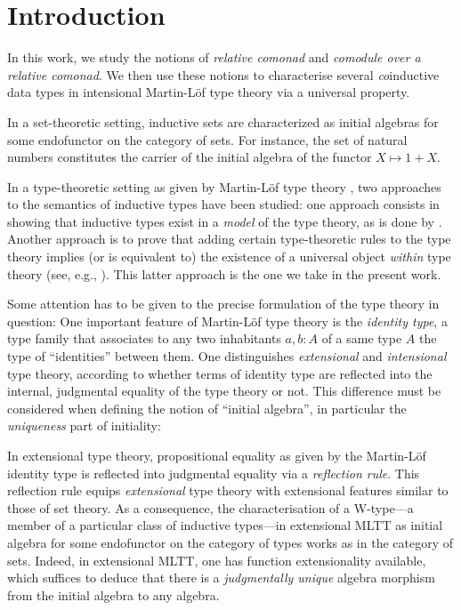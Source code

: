 \documentclass[envcountsame]{llncs}
\begin{document}
\section{Introduction}
 
 In this work, we study the notions of \emph{relative comonad} and \emph{comodule over a relative comonad}.
 We then use these notions to characterise several \emph{co}inductive data types in intensional Martin-L\"of type theory
 via a universal property.
 
 In a set-theoretic setting, inductive sets are characterized as initial algebras for 
 some endofunctor on the category of sets. For instance, the set of natural numbers constitutes the carrier of the 
 initial algebra of the functor $X \mapsto 1 + X$.
 
 In a type-theoretic setting as given by Martin-L\"of type theory \parencite{martin_lof}, 
 two approaches to the semantics of inductive types have been studied: 
 one approach consists in showing that inductive types exist in a \emph{model} of the type theory,
 as is done by \textcite{DBLP:journals/apal/MoerdijkP00}.
 Another approach is to prove that adding certain type-theoretic rules to the type theory
 implies (or is equivalent to) the existence of a universal object \emph{within} type theory
 (see, e.g., \parencite{DBLP:conf/lics/AwodeyGS12, DBLP:journals/tcs/Dybjer97}).
 This latter approach is the one we take in the present work.
 
 Some attention has to be given to 
 the precise formulation of the type theory in question:
 One important feature of Martin-L\"of type theory is the \emph{identity type}, a type family that associates to any two 
 inhabitants $a,b : A$ of a same type $A$ the type of \enquote{identities} between them.
 One distinguishes \emph{extensional} and \emph{intensional} type theory, according to whether terms of identity type
 are reflected into the internal, judgmental equality of the type theory or not. This difference must be considered when defining the notion of
 \enquote{initial algebra}, in particular the \emph{uniqueness} part of initiality:
 
 In extensional type theory, propositional equality as given by the Martin-L\"of identity type \parencite{martin_lof} is reflected 
 into judgmental equality via a \emph{reflection rule}.
 This reflection rule equips \emph{extensional} type theory with extensional features similar to those of set theory.
 As a consequence, the characterisation of a \textsf{W}-type---a member of a particular class of inductive types---in extensional MLTT as initial algebra for some endofunctor on the 
 category of types \parencite{DBLP:journals/tcs/Dybjer97} works as in the category of sets.
 Indeed, in extensional MLTT, one has function extensionality available, which suffices to 
 deduce that there is a \emph{judgmentally unique} algebra morphism from the initial algebra to any algebra.
\end{document}
